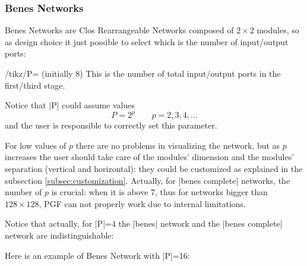 \documentclass{ltxdoc}
\begin{document}
\begin{codeexample}[]
\begin{tikzpicture}
    \node[clos rear,N=9,r1=3,M=9,r3=3] {};
\end{tikzpicture}
\end{codeexample}

\subsubsection{Benes Networks}
\label{subsubsec:benes}
Benes Networks are Clos Rearrangeable Networks composed of $2 \times 2$ modules, so as design choice it just possible to select which is the number of input/output ports:

\begin{key}{/tikz/P= (initially 8)}
    This is the number of total input/output ports in the first/third stage.
\end{key}

Notice that |P| could assume values
\[P=2^p \qquad p=2,3,4,\ldots\]
and the user is responsible to correctly set this parameter.

For low values of $p$ there are no problems in visualizing the network, but as $p$ increases the user should take care of the modules' dimension  and the modules' separation (vertical and horizontal): they could be customized as explained in the subsection \ref{subsec:customization}. Actually, for |benes complete| networks, the number of $p$ is crucial: when it is above 7, thus for networks bigger than  $128\times 128$, PGF can not properly work due to internal limitations.

Notice that actually, for |P|=4 the |benes| network and the |benes complete| network are indistinguishable:
\begin{codeexample}[]
\begin{tikzpicture}
\tikzset{module size=0.5cm,
 pin length factor=0.5,
 module ysep=1}
 \node[P=4,benes] {};
 \begin{scope}[xshift=6cm]
     \node[module xsep=2.5,P=4,benes complete]{};
 \end{scope}
\end{tikzpicture}
\end{codeexample}


Here is an example of Benes Network with |P|=16:
\begin{codeexample}[]
\begin{tikzpicture}
    \node[P=16,benes] {};
\end{tikzpicture}
\end{codeexample}
\end{document}

